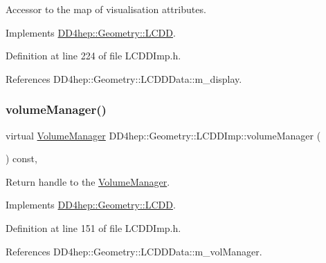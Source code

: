 Accessor to the map of visualisation attributes. 



Implements \hyperlink{class_d_d4hep_1_1_geometry_1_1_l_c_d_d_abb60505e37d62147725d126cb21d171b}{D\+D4hep\+::\+Geometry\+::\+L\+C\+DD}.



Definition at line 224 of file L\+C\+D\+D\+Imp.\+h.



References D\+D4hep\+::\+Geometry\+::\+L\+C\+D\+D\+Data\+::m\+\_\+display.

\hypertarget{class_d_d4hep_1_1_geometry_1_1_l_c_d_d_imp_a5fee28118cf380641f704a1139d46c4b}{}\label{class_d_d4hep_1_1_geometry_1_1_l_c_d_d_imp_a5fee28118cf380641f704a1139d46c4b} 
\subsubsection{\texorpdfstring{volume\+Manager()}{volumeManager()}}
{\footnotesize\ttfamily virtual \hyperlink{class_d_d4hep_1_1_geometry_1_1_volume_manager}{Volume\+Manager} D\+D4hep\+::\+Geometry\+::\+L\+C\+D\+D\+Imp\+::volume\+Manager (\begin{DoxyParamCaption}{ }\end{DoxyParamCaption}) const\hspace{0.3cm}{\ttfamily [inline]}, {\ttfamily [virtual]}}



Return handle to the \hyperlink{class_d_d4hep_1_1_geometry_1_1_volume_manager}{Volume\+Manager}. 



Implements \hyperlink{class_d_d4hep_1_1_geometry_1_1_l_c_d_d_a2112b2267f5f07ecc94e909d696ffdbd}{D\+D4hep\+::\+Geometry\+::\+L\+C\+DD}.



Definition at line 151 of file L\+C\+D\+D\+Imp.\+h.



References D\+D4hep\+::\+Geometry\+::\+L\+C\+D\+D\+Data\+::m\+\_\+vol\+Manager.

\hypertarget{class_d_d4hep_1_1_geometry_1_1_l_c_d_d_imp_a6c6988d4772aef0d4a7946865b15962d}{}\label{class_d_d4hep_1_1_geometry_1_1_l_c_d_d_imp_a6c6988d4772aef0d4a7946865b15962d} 
